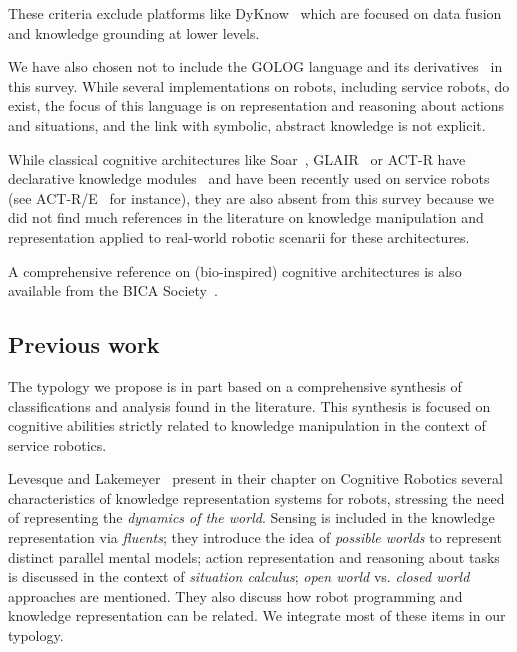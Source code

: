 \documentclass[a4paper, twocolumn]{article}
\begin{document}
These criteria exclude platforms like {\sc DyKnow}~\cite{Heintz2004}
which are focused on data fusion and knowledge grounding at lower levels.

We have also chosen not to include the GOLOG language and its
derivatives~\cite{Levesque1997, Ferrein2008, Gspandl2011} in this survey. While
several implementations on robots, including service robots, do exist, the
focus of this language is on representation and reasoning about actions and
situations, and the link with symbolic, abstract knowledge is not explicit.

While classical cognitive architectures like {\sc Soar}~\cite{Lehman2006},
GLAIR~\cite{Shapiro2009} or {\sc ACT-R} have declarative knowledge
modules~\cite{Derbinsky2010} and have been recently used on service robots (see
{\sc ACT-R/E}~\cite{Kennedy2009} for instance), they are also absent from this
survey because we did not find much references in the literature on knowledge
manipulation and representation applied to real-world robotic scenarii for
these architectures.

A comprehensive reference on (bio-inspired) cognitive architectures is also
available from the BICA Society~\cite{BicaCogArch2011}.

\subsection{Previous work}
\label{sect|evaluation-literature}

The typology we propose is in part based on a comprehensive synthesis of
classifications and analysis found in the literature. This synthesis is focused
on cognitive abilities strictly related to knowledge manipulation in the
context of service robotics.

Levesque and Lakemeyer~\cite{Levesque2008} present in their chapter on
Cognitive Robotics several characteristics of knowledge representation systems
for robots, stressing the need of representing the \emph{dynamics of the
world}.  Sensing is included in the knowledge representation via
\emph{fluents}; they introduce the idea of \emph{possible worlds} to represent
distinct parallel mental models; action representation and reasoning about
tasks is discussed in the context of \emph{situation calculus}; \emph{open
world} vs. \emph{closed world} approaches are mentioned.  They also discuss how
robot programming and knowledge representation can be related. We integrate
most of these items in our typology.
\end{document}
